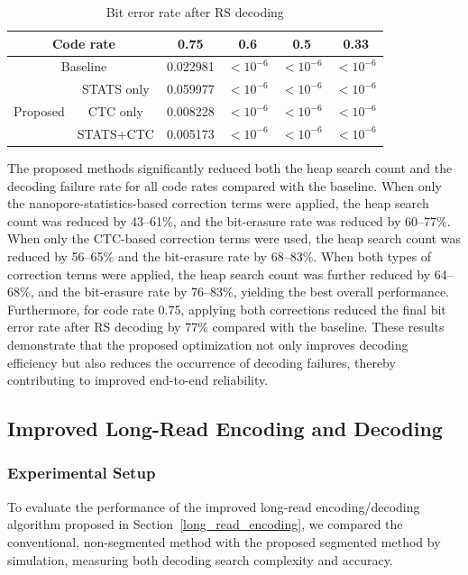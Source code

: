 \documentclass[sotsuron]{kuee}
\begin{document}
\begin{table}
  \centering
  \caption{Bit error rate after RS decoding}
  \label{tab:results_final_ber}
  \begin{tabular}{c|c|cccc}
    \hline
    \multicolumn{2}{c|}{Code rate} & 0.75 & 0.6 & 0.5 & 0.33 \\
    \hline
    \multicolumn{2}{c|}{Baseline} & 0.022981 & $<10^{-6}$ & $<10^{-6}$ & $<10^{-6}$ \\
    \hline
    \multirow{3}{*}{Proposed} & STATS only & 0.059977 & $<10^{-6}$ & $<10^{-6}$ & $<10^{-6}$ \\
    \cline{2-6}
     & CTC only & 0.008228 & $<10^{-6}$ & $<10^{-6}$ & $<10^{-6}$ \\
    \cline{2-6}
     & STATS+CTC & 0.005173 & $<10^{-6}$ & $<10^{-6}$ & $<10^{-6}$ \\
    \hline
  \end{tabular}
\end{table}
The proposed methods significantly reduced both the heap search count and the decoding failure rate for all
code rates compared with the baseline.
When only the nanopore-statistics-based correction terms were applied, the heap search count was reduced by
43--61\%, and the bit-erasure rate was reduced by 60--77\%.
When only the CTC-based correction terms were used, the heap search count was reduced by 56--65\% and the
bit-erasure rate by 68--83\%.
When both types of correction terms were applied, the heap search count was further reduced by 64--68\%, and
the bit-erasure rate by 76--83\%, yielding the best overall performance.
Furthermore, for code rate 0.75, applying both corrections reduced the final bit error rate after RS decoding
by 77\% compared with the baseline.
These results demonstrate that the proposed optimization not only improves decoding efficiency but also
reduces the occurrence of decoding failures, thereby contributing to improved end-to-end reliability.

\subsection{Improved Long-Read Encoding and Decoding} \label{sim2}
\subsubsection{Experimental Setup}
To evaluate the performance of the improved long-read encoding/decoding algorithm proposed in
Section~\ref{long_read_encoding}, we compared the conventional, non-segmented method with the proposed
segmented method by simulation, measuring both decoding search complexity and accuracy.
\end{document}
